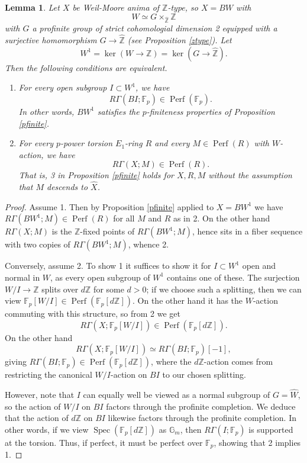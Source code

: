 \documentclass[12pt]{article}
\newtheorem{lemma}[theorem]{Lemma}
\theoremstyle{definition}
\newcommand{\on}{\operatorname}
\newcommand{\mbb}{\mathbb}
\newcommand{\wh}{\widehat}
\begin{document}
\begin{lemma}\label{whenignorewhat}
Let $X$ be  Weil-Moore anima of $\mbb{Z}$-type, so $X=BW$ with
$$W\simeq G\times_{\wh{\mbb{Z}}}\mbb{Z}$$
with $G$ a profinite group of strict cohomologial dimension 2 equipped with a surjective homomorphism $G\to\wh{\mbb{Z}}$ (see Proposition \ref{ztype}).  Let
$$W^1 = \on{ker}(W\to\mbb{Z}) = \on{ker}(G\to\wh{\mbb{Z}}).$$
Then the following conditions are equivalent.

\begin{enumerate}
\item For every open subgroup $I\subset W^1$, we have
$$R\Gamma(BI;\mbb{F}_p)\in\on{Perf}(\mbb{F}_p).$$
In other words, $BW^1$ satisfies the $p$-finiteness properties of Proposition \ref{pfinite}.
\item For every $p$-power torsion $E_1$-ring $R$ and every $M\in\on{Perf}(R)$ with $W$-action, we have
$$R\Gamma(X;M)\in \on{Perf}(R).$$
That is, 3 in Proposition \ref{pfinite} holds for $X,R,M$ without the assumption that $M$ descends to $\wh{X}$.

\end{enumerate}
\end{lemma}
\begin{proof}

Assume 1.  Then by Proposition \ref{pfinite} applied to $X=BW^1$ we have $R\Gamma(BW^1;M)\in \on{Perf}(R)$ for all $M$ and $R$ as in 2.  On the other hand  $
R\Gamma(X;M)$ is the $\mbb{Z}$-fixed points of $R\Gamma(BW^1;M)$, hence sits in a fiber sequence with two copies of $R\Gamma(BW^1;M)$, whence 2.

Conversely, assume 2.  To show 1 it suffices to show it for $I\subset W^1$ open and normal in $W$, as every open subgroup of $W^1$ contains one of these.  The surjection $W/I \to \mbb{Z}$ splits over $d\mbb{Z}$ for some $d>0$; if we choose such a splitting, then we can view $\mbb{F}_p[W/I] \in\on{Perf}(\mbb{F}_p[d\mbb{Z}])$.  On the other hand it has the $W$-action commuting with this structure, so from 2 we get
$$R\Gamma(X;\mbb{F}_p[W/I])\in\on{Perf}(\mbb{F}_p[d\mbb{Z}]).$$
On the other hand
$$R\Gamma(X;\mbb{F}_p[W/I])\simeq R\Gamma(BI;\mbb{F}_p)[-1],$$
giving $R\Gamma(BI;\mbb{F}_p)\in \on{Perf}(\mbb{F}_p[d\mbb{Z}])$, where the $d\mbb{Z}$-action comes from restricting the canonical $W/I$-action on $BI$ to our chosen splitting.

However, note that $I$ can equally well be viewed as a normal subgroup of $G=\wh{W}$, so the action of $W/I$ on $BI$ factors through the profinite completion.  We deduce that the action of $d\mbb{Z}$ on $BI$ likewise factors through the profinite completion.  In other words, if we view $\on{Spec}(\mbb{F}_p[d\mbb{Z}])$ as $\mbb{G}_m$, then $R\Gamma(I;\mbb{F}_p)$ is supported at the torsion.  Thus, if perfect, it must be perfect over $\mbb{F}_p$, showing that 2 implies 1.
\end{proof}
\end{document}
